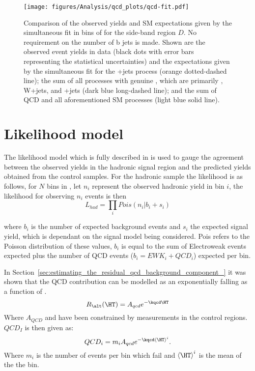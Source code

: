 \begin{figure}[!h]
  \begin{center}
    \texttt{[image: figures/Analysis/qcd\_plots/qcd-fit.pdf]}
    \caption{Comparison of the observed yields and SM expectations
      given by the simultaneous fit in bins of \HT for the
      side-band region $D$. No requirement on the number of b jets is
      made. Shown are the observed event yields in data (black dots
      with error bars representing the statistical uncertainties) and
      the expectations given by the simultaneous fit for the
      \HepProcess{\PZ\to\nu\nu}+jets process (orange dotted-dashed line); the 
      sum of all processes with genuine \MET, which are primarily 
      \HepProcess{\Ptop\APtop}, W+jets, and \HepProcess{\PZ\to\nu\nu}+jets
      (dark blue long-dashed line); and the sum of QCD and all aforementioned 
      SM processes (light blue solid line).\cite{CMS-AN-11-517}}
    \label{fig:qcd-fit}
  \end{center}
\end{figure}




\section{Likelihood model} %
\label{sec:likelihood_model}
The likelihood model which is fully described in \cite{ted} is used to gauge 
the agreement between the observed yields in the hadronic signal region and the 
predicted yields obtained from the control samples.
For the hadronic sample the likelihood is as follows, for $N$ bins in \HT, let 
$n_{i}$ represent the observed hadronic yield in \HT bin $i$, the likelihood 
for observing $n_{i}$ events is then
\begin{equation}
  L_{had} = \prod_{i}Pois\left(n_{i}|b_{i}+s_{i}\right)
\label{eqn:l_had}
\end{equation}

where $b_{i}$ is the number of expected background events and $s_{i}$ the 
expected signal yield, which is dependant on the signal model being considered.
Pois refers to the Poisson distribution of these values, $b_{i}$ is equal to 
the sum of Electroweak events expected plus the number of QCD events ($b_{i} = 
EWK_{i}+QCD_{i}$) expected per bin.

In Section~\ref{sec:estimating_the_residual_qcd_background_component_} it was 
shown that the QCD contribution can be modelled as an exponentially falling as 
a function of \HT.
\begin{equation}
  R_{\alt}(\HT) = A_{qcd}e^{-\kqcd \HT}
\end{equation}
Where $A_{QCD}$ and \kqcd have been constrained by measurements in the control regions. $QCD_{I}$ is then given as:
\begin{equation}
  QCD_{i} = m_{i}A_{qcd}e^{-\kqcd \left<\HT\right>^{i}}.
  \label{eqn:qcdi}
\end{equation}
Where $m_{i}$ is the number of events per \HT bin which fail \altg and $\left<\HT\right>^{i}$ is the mean \HT of the the bin.


